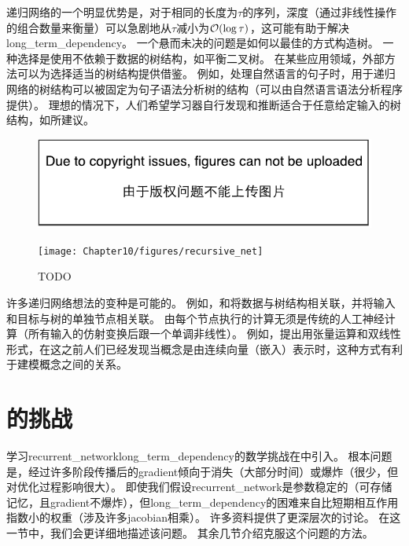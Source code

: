 
递归网络的一个明显优势是，对于相同的长度为$\tau$的序列，深度（通过非线性操作的组合数量来衡量）可以急剧地从$\tau$减小为$\mathcal{O}(\log \tau)$，这可能有助于解决\gls{long_term_dependency}。
一个悬而未决的问题是如何以最佳的方式构造树。
一种选择是使用不依赖于数据的树结构，如平衡二叉树。
在某些应用领域，外部方法可以为选择适当的树结构提供借鉴。
例如，处理自然语言的句子时，用于递归网络的树结构可以被固定为句子语法分析树的结构（可以由自然语言语法分析程序提供）\citep{Socher+al-NIPS2011,Socher+al-EMNLP2011-small}。
理想的情况下，人们希望学习器自行发现和推断适合于任意给定输入的树结构，如\citep{tr-bottou-2011}所建议。


\begin{figure}[!htb]
\ifOpenSource
\centerline{\includegraphics{figure.pdf}}
\else
\centerline{\texttt{[image: Chapter10/figures/recursive\_net]}}
\fi
\caption{TODO}
\label{fig:chap10_recursive_net}
\end{figure}

许多递归网络想法的变种是可能的。
例如，\cite{Frasconi97}和\cite{Frasconi-1998}将数据与树结构相关联，并将输入和目标与树的单独节点相关联。
由每个节点执行的计算无须是传统的人工神经计算（所有输入的仿射变换后跟一个单调非线性）。
例如，\cite{Socher-et-al-EMNLP2013}提出用张量运算和双线性形式，在这之前人们已经发现当概念是由连续向量（嵌入）表示时，这种方式有利于建模概念之间的关系\citep{Weston+Bengio+Usunier-2010,Bordes-et-al-AISTATS2012-small}。

\section{的挑战}
\label{sec:the_challenge_of_long_term_dependencies}
学习\gls{recurrent_network}\gls{long_term_dependency}的数学挑战在中引入。
根本问题是，经过许多阶段传播后的\gls{gradient}倾向于消失（大部分时间）或爆炸（很少，但对优化过程影响很大）。
即使我们假设\gls{recurrent_network}是参数稳定的（可存储记忆，且\gls{gradient}不爆炸），但\gls{long_term_dependency}的困难来自比短期相互作用指数小的权重（涉及许多\gls{jacobian}相乘）。
许多资料提供了更深层次的讨论\citep{Hochreiter91-small,Doya93,Bengio1994ITNN,Pascanu+al-ICML2013-small}。
在这一节中，我们会更详细地描述该问题。
其余几节介绍克服这个问题的方法。

